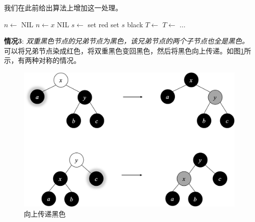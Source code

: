 \documentclass[b5paper]{ctexart}
\begin{document}
我们在此前给出算法上增加这一处理。

\begin{algorithmic}[1]
  \State $n \gets$ NIL
    
    \State $n \gets x$
  \EndIf
   
    \State \Return NIL
  \EndIf
        \State $s \gets$ 
           
          \State set  red
          \State set $s$ black
           
            \State $T \gets$ 
          \Else {}
            \State $T \gets$ 
          \EndIf
          \State ...
        \EndIf
    \EndIf
  \EndWhile
\EndFunction
\end{algorithmic}

\textbf{情况3}: {\em 双重黑色节点的兄弟节点为黑色，该兄弟节点的两个子节点也全是黑色。}可以将兄弟节点染成红色，将双重黑色变回黑色，然后将黑色向上传递。如图\cref{fig:del-case3}所示，有两种对称的情况。

\begin{figure}[htbp]
  \centering
  \includegraphics[scale=0.4]{../../../datastruct/tree/red-black-tree/img/del-case3}
  \caption{向上传递黑色}
  \label{fig:del-case3}

\end{figure}
\end{document}
